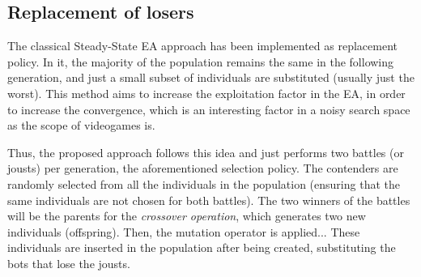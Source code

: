 \documentclass[conference]{IEEEtran}
\begin{document}
\subsection{Replacement of losers}
\label{subsec:replacement}



The classical Steady-State EA approach \cite{Genitor_whitley} has been implemented as replacement policy. In it, the majority of the population remains the same in the following generation, and just a small subset of individuals are substituted (usually just the worst). This method aims to increase the exploitation factor in the EA, in order to increase the convergence, which is an interesting factor in a noisy search space as the scope of videogames is.



Thus, the proposed approach follows this idea and just performs two battles (or jousts) per generation, the aforementioned selection policy. The contenders are randomly selected from all the individuals in the population (ensuring that the same individuals are not chosen for both battles).
The two winners of the battles will be the parents for the \textit{crossover operation}, which generates two new individuals (offspring).
Then, the mutation operator is applied...
These individuals are inserted in the population after being created, substituting the bots that lose the jousts.
\end{document}
